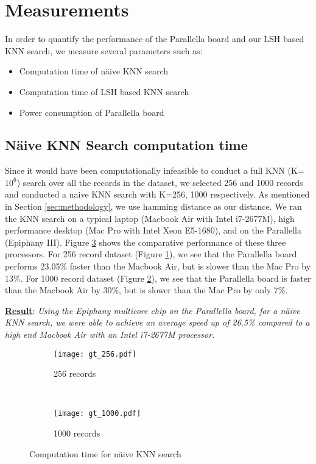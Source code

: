 \section{Measurements}
\label{sec:measurements}
In order to quantify the performance of the Parallella board and our LSH based KNN search, we measure several parameters such as:
\begin{itemize}
\item Computation time of n\"{a}ive KNN search
\item Computation time of LSH based KNN search
\item Power consumption of Parallella board
\end{itemize}
\subsection{N\"{a}ive KNN Search computation time}
\label{subsec:nknn_comptime}
Since it would have been computationally infeasible to conduct a full KNN (K=$10^6$) search over all the records in the dataset, we selected 256 and 1000 records and conducted a naive KNN search with K=256, 1000 respectively. 
As mentioned in Section \ref{sec:methodology}, we use hamming distance as our distance. We ran the KNN search on a typical laptop (Macbook Air with Intel i7-2677M), high performance desktop (Mac Pro with Intel Xeon E5-1680), and on the Parallella (Epiphany III). Figure \ref{fig:fullK256_1000} shows the comparative performance of these three processors. For 256 record dataset (Figure \ref{fig:k256_comptime}), we see that the Parallella board performs 23.05\% faster than the Macbook Air, but is slower than the Mac Pro by 13\%. For 1000 record dataset (Figure \ref{fig:k1000_comptime}), we see that the Parallella board is faster than the Macbook Air by 30\%, but is slower than the Mac Pro by only 7\%.

\textbf{\underline{Result}}: \textit{Using the Epiphany multicore chip on the Parallella board, for a n\"{a}ive KNN search, we were able to achieve an average speed up of 26.5\% compared to a high end Macbook Air with an Intel i7-2677M processor.}
\begin{figure}
\centering
\begin{subfigure}[b]{0.45\textwidth}
	\texttt{[image: gt\_256.pdf]}
	\caption{256 records}
	\label{fig:k256_comptime}
\end{subfigure}
~
\begin{subfigure}[b]{0.45\textwidth}
	\texttt{[image: gt\_1000.pdf]}
	\caption{1000 records}
	\label{fig:k1000_comptime}
\end{subfigure}
\caption{Computation time for n\"{a}ive KNN search}
\label{fig:fullK256_1000}
\end{figure}